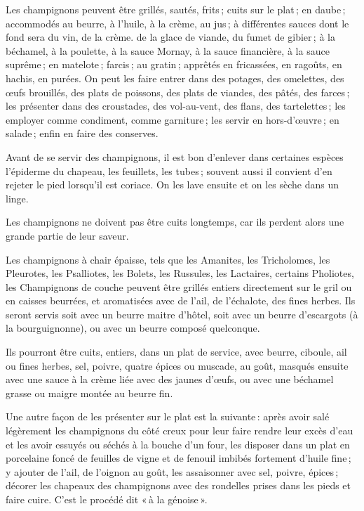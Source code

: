 
Les champignons peuvent être grillés, sautés, frits ; cuits sur le plat ; en
daube ; accommodés au beurre, à l'huile, à la crème, au jus ; à différentes
sauces dont le fond sera du vin, de la crème. de la glace de viande, du fumet
de gibier ; à la béchamel, à la poulette, à la sauce Mornay, à la sauce
financière, à la sauce suprême ; en matelote ; farcis ; au gratin ; apprêtés en
fricassées, en ragoûts, en hachis, en purées. On peut les faire entrer dans des
potages, des omelettes, des œufs brouillés, des plats de poissons, des plats de
viandes, des pâtés, des farces ; les présenter dans des croustades, des
vol-au-vent, des flans, des tartelettes ; les employer comme condiment, comme
garniture ; les servir en hors-d'œuvre ; en salade ; enfin en faire des
conserves.

Avant de se servir des champignons, il est bon d'enlever dans certaines espèces
l'épiderme du chapeau, les feuillets, les tubes ; souvent aussi il convient d'en
rejeter le pied lorsqu'il est coriace. On les lave ensuite et on les sèche dans un
linge.

Les champignons ne doivent pas être cuits longtemps, car ils perdent alors
une grande partie de leur saveur.

\medskip

Les champignons à chair épaisse, tels que les Amanites, les Tricholomes, les
Pleurotes, les Psalliotes, les Bolets, les Russules, les Lactaires, certains Pholiotes,
les Champignons de couche peuvent être grillés entiers directement sur le gril ou
en caisses beurrées, et aromatisées avec de l'ail, de l'échalote, des fines herbes.
Ils seront servis soit avec un beurre maitre d'hôtel, soit avec un beurre d'escargots
(à la bourguignonne), ou avec un beurre composé quelconque.

\medskip

Ils pourront être cuits, entiers, dans un plat de service, avec beurre,
ciboule, ail ou fines herbes, sel, poivre, quatre épices ou muscade, au goût,
masqués ensuite avec une sauce à la crème liée avec des jaunes d'œufs, ou avec
une béchamel grasse ou maigre montée au beurre fin.

Une autre façon de les présenter sur le plat est la suivante : après avoir salé
légèrement les champignons du côté creux pour leur faire rendre leur excès
d'eau et les avoir essuyés ou séchés à la bouche d’un four, les disposer dans un
plat en porcelaine foncé de feuilles de vigne et de fenouil imbibés fortement
d'huile fine ; y ajouter de l'ail, de l'oignon au goût, les assaisonner avec sel,
poivre, épices ; décorer les chapeaux des champignons avec des rondelles prises
dans les pieds et faire cuire. C'est le procédé dit « à la génoise ».

